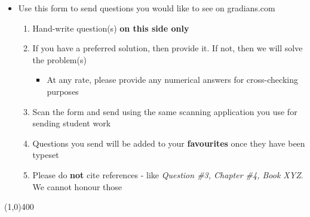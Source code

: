 \documentclass[12pt,a4paper,justified]{tufte-exam}
\begin{document}
  \begin{fullwidth}
    \begin{itemize}
      \item Use this form to send questions you would like to see on gradians.com
      \begin{enumerate}
        \item Hand-write question(s) \textbf{on this side only} 
        \item If you have a preferred solution, then provide it. If not, then we will solve the problem(s)
        \begin{itemize}
          \item At any rate, please provide any numerical answers for cross-checking purposes
        \end{itemize}
        \item Scan the form and send using the same scanning application you use for sending student work
        \item Questions you send will be added to your \textbf{favourites} once they have been typeset
        \item Please do \textbf{not} cite references - like \textit{Question \#3, Chapter \#4, Book XYZ}.
              We cannot honour those
      \end{enumerate}
    \end{itemize}
    \line(1,0){400}
  \end{fullwidth}
\end{document}

